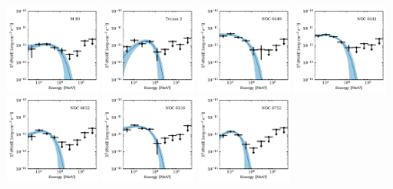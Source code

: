 \documentclass[doublespace,nopageskip]{VTthesis} %
\begin{document}
\begin{appendices}
\begin{figure}
\centering
\includegraphics[width=0.24\textwidth]{Figures/Globular/spectra/PLE_spectrum_8.pdf}
\includegraphics[width=0.24\textwidth]{Figures/Globular/spectra/PLE_spectrum_28.pdf}
\includegraphics[width=0.24\textwidth]{Figures/Globular/spectra/PLE_spectrum_18.pdf}
\includegraphics[width=0.24\textwidth]{Figures/Globular/spectra/PLE_spectrum_19.pdf}
\includegraphics[width=0.24\textwidth]{Figures/Globular/spectra/PLE_spectrum_22.pdf}
\includegraphics[width=0.24\textwidth]{Figures/Globular/spectra/PLE_spectrum_13.pdf}
\includegraphics[width=0.24\textwidth]{Figures/Globular/spectra/PLE_spectrum_24.pdf}

\end{figure}
\end{appendices}
\end{document}
